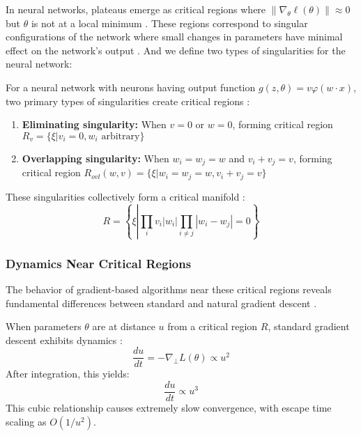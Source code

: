 \documentclass[a4paper]{article}
\begin{document}
In neural networks, plateaus emerge as critical regions where $\|\nabla_\theta \ell(\theta)\| \approx 0$ but $\theta$ is not at a local minimum \cite{dauphin2014identifying}. These regions correspond to singular configurations of the network where small changes in parameters have minimal effect on the network's output \cite{amari2016information}. And we define two types of singularities for the neural network:

\begin{definition}
For a neural network with neurons having output function $g(z, \theta) = v\varphi(w \cdot x)$, two primary types of singularities create critical regions \cite{wei2008dynamics}:
\begin{enumerate}
    \item \textbf{Eliminating singularity:} When $v = 0$ or $w = 0$, forming critical region $R_v = \{\xi | v_i = 0, w_i \text{ arbitrary}\}$
    \item \textbf{Overlapping singularity:} When $w_i = w_j = w$ and $v_i + v_j = v$, forming critical region $R_{ovl}(w, v) = \{\xi | w_i = w_j = w, v_i + v_j = v\}$
\end{enumerate}
\end{definition}

These singularities collectively form a critical manifold \cite{fukumizu2000local}:
\begin{equation}
R = \left\{\xi \left| \prod_i v_i |w_i| \prod_{i \neq j} |w_i - w_j| = 0 \right.\right\}
\end{equation}

\subsubsection{Dynamics Near Critical Regions}

The behavior of gradient-based algorithms near these critical regions reveals fundamental differences between standard and natural gradient descent \cite{yang1998complexity, amari1998natural}.

\begin{theorem}
When parameters $\theta$ are at distance $u$ from a critical region $R$, standard gradient descent exhibits dynamics \cite{fukumizu2000local, wei2008dynamics}:
\begin{equation}
\frac{du}{dt} = -\nabla_{\perp} L(\theta) \propto u^2
\end{equation}
After integration, this yields:
\begin{equation}
\frac{du}{dt} \propto u^3
\end{equation}
This cubic relationship causes extremely slow convergence, with escape time scaling as $O(1/u^2)$.
\end{theorem}
\end{document}
